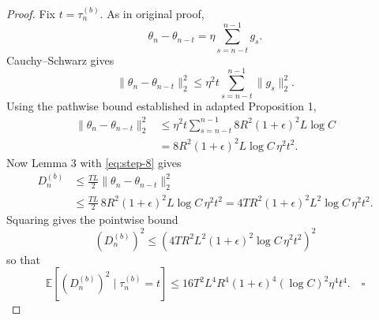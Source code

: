 \documentclass[10pt]{article}
\newcommand{\E}{\mathbb{E}}
\theoremstyle{preserved}
\begin{document}
\begin{proof} Fix $t=\tau_n^{(b)}$. As in original proof,
\begin{equation*}
\theta_n-\theta_{n-t}=\eta\sum_{s=n-t}^{n-1}g_s.
\end{equation*}
Cauchy--Schwarz gives
\begin{equation*}
\|\theta_n-\theta_{n-t}\|_2^2\le\eta^2t\sum_{s=n-t}^{n-1}\|g_s\|_2^2.
\end{equation*}
Using the pathwise bound established in adapted Proposition 1,
\begin{equation}
\begin{aligned}
\|\theta_n-\theta_{n-t}\|_2^2
&\le\eta^2t\sum_{s=n-t}^{n-1}8R^2(1+\epsilon)^2L\log C\\
&=8R^2(1+\epsilon)^2L\log C\,\eta^2t^2.\label{eq:step-8}
\end{aligned}
\end{equation}
Now Lemma 3 with \eqref{eq:step-8} gives
\begin{equation*}
\begin{aligned}
D_n^{(b)}&\le\frac{TL}{2}\|\theta_n-\theta_{n-t}\|_2^2\\
&\le\frac{TL}{2}\,8R^2(1+\epsilon)^2L\log C\,\eta^2t^2
=4TR^2(1+\epsilon)^2L^2\log C\,\eta^2t^2.
\end{aligned}
\end{equation*}
Squaring gives the pointwise bound
\begin{equation*}
(D_n^{(b)})^2\le\left(4T R^2L^2(1+\epsilon)^2\log C\,\eta^2t^2\right)^2
\end{equation*}
so that
\begin{equation*}
\E[(D_n^{(b)})^2\mid\tau_n^{(b)}=t]\le16T^2L^4R^4(1+\epsilon)^4(\log C)^2\eta^4t^4.\quad\square
\end{equation*}
\end{proof}
\end{document}
